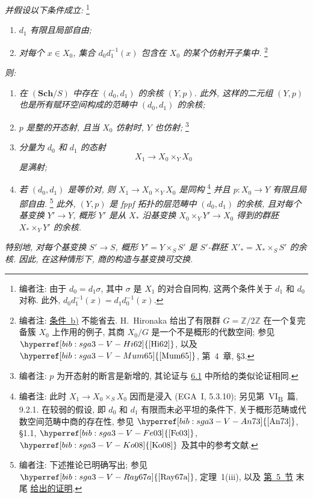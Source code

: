 \textit{并假设以下条件成立:}%
\footnote{\label{note:sga3-V-16}编者注: 由于 \(d_0=d_1\sigma\),
其中 \(\sigma\) 是 \(X_1\) 的对合自同构,
这两个条件关于 \(d_1\) 和 \(d_0\) 对称.
此外, \(d_0d_1^{-1}(x)=d_1d_0^{-1}(x)\).}
\begin{enumerate}
\item[\textit{a)}]\label{thm:sga3-V-4.1-a}%
  \textit{\(d_1\) 有限且局部自由;}
\item[\textit{b)}]\label{thm:sga3-V-4.1-b}%
  \textit{对每个 \(x\in X_0\), 集合 \(d_0d_1^{-1}(x)\)
  包含在 \(X_0\) 的某个仿射开子集中.}%
  \footnote{\label{note:sga3-V-17}编者注:
  \hyperref[thm:sga3-V-4.1-b]{条件~b)} 不能省去.
  H.~Hironaka 给出了有限群 \(G=\mathbb Z/2\mathbb Z\)
  在一个复完备簇 \(X_0\) 上作用的例子, 其商 \(X_0/G\)
  是一个不是概形的代数空间; 参见
  \(\hyperref[bib:sga3-V-Hi62]{[{\rm Hi62}]}\), 以及
  \(\hyperref[bib:sga3-V-Mum65]{[{\rm Mum65}]}\), 第~4~章, \S3.}
\end{enumerate}
\textit{则:}
\begin{enumerate}
\item[(i)]\label{thm:sga3-V-4.1-i}%
  \textit{在 \((\mathbf{Sch}/S)\) 中存在 \((d_0,d_1)\)
  的余核 \((Y,p)\). 此外, 这样的二元组 \((Y,p)\)
  也是所有赋环空间构成的范畴中 \((d_0,d_1)\) 的余核;}
\item[\SGAInlineRefTarget{thm:sga3-V-4.1:item:ii}(ii)]\label{thm:sga3-V-4.1-ii}%
  \textit{\(p\) 是整的开态射, 且当 \(X_0\) 仿射时, \(Y\) 也仿射;}%
  \footnote{\label{note:sga3-V-18}编者注: \(p\) 为开态射的断言是新增的,
  其论证与 \hyperref[lem:sga3-V-6.1]{6.1} 中所给的类似论证相同.}
\item[(iii)]\label{thm:sga3-V-4.1-iii}%
  \textit{分量为 \(d_0\) 和 \(d_1\) 的态射
  \[
    X_1\longrightarrow X_0\times_YX_0
  \]
  是满射;}
\item[(iv)]\label{thm:sga3-V-4.1-iv}%
  \textit{若 \((d_0,d_1)\) 是等价对, 则
  \(X_1\to X_0\times_YX_0\) 是同构}%
  \footnote{\label{note:sga3-V-19}编者注: 此时
  \(X_1\to X_0\times_SX_0\) 因而是浸入
  (EGA~I, 5.3.10); 另见第~VI\textsubscript{B}~篇, 9.2.1.
  在较弱的假设, 即 \(d_0\) 和 \(d_1\) 有限而未必平坦的条件下,
  关于概形范畴或代数空间范畴中商的存在性, 参见
  \(\hyperref[bib:sga3-V-An73]{[{\rm An73}]}\), \S1.1,
  \(\hyperref[bib:sga3-V-Fe03]{[{\rm Fe03}]}\),
  \(\hyperref[bib:sga3-V-Ko08]{[{\rm Ko08}]}\) 及其中的参考文献.}
  \textit{并且 \(p:X_0\to Y\) 有限且局部自由.}%
  \footnote{\label{note:sga3-V-20}编者注: 下述推论已明确写出;
  参见 \(\hyperref[bib:sga3-V-Ray67a]{[{\rm Ray67a}]}\),
  定理~1(iii), 以及 \hyperref[sec:sga3-V-5]{第~5~节} 末尾
  \hyperref[proof:sga3-V-5-b-general]{给出的证明}.}
  \textit{此外, \((Y,p)\) 是 fppf 拓扑的层范畴中
  \((d_0,d_1)\) 的余核, 且对每个基变换 \(Y'\to Y\),
  概形 \(Y'\) 是从 \(X_\ast\) 沿基变换
  \(X_0\times_YY'\to X_0\) 得到的群胚
  \(X_\ast\times_YY'\) 的余核.}
\end{enumerate}
\textit{特别地, 对每个基变换 \(S'\to S\),
概形 \(Y'=Y\times_SS'\) 是 \(S'\)-群胚
\(X'_\ast=X_\ast\times_SS'\) 的余核.
因此, 在这种情形下, 商的构造与基变换可交换.}

